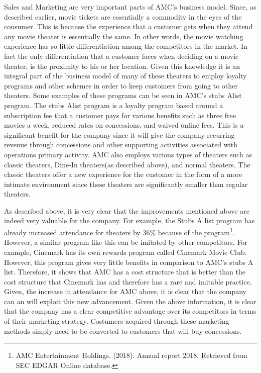 \documentclass[12pt]{article}
\begin{document}
Sales and Marketing are very important parts of AMC's business model. Since, as described earlier, movie tickets are essentially a commodity in the eyes of the consumer. This is because the experience that a customer gets when they attend any movie theater is essentially the same. In other words, the movie watching experience has so little differentiation among the competitors in the market. In fact the only differentiation that a customer faces when deciding on a movie theater, is the proximity to his or her location. Given this knowledge it is an integral part of the business model of many of these theaters to employ loyalty programs and other schemes in order to keep customers from going to other theaters. Some examples of these programs can be seen in AMC's stubs Alist program. The stubs Alist program is a loyalty program based around a subscription fee that a customer pays for various benefits such as three free movies a week, reduced rates on concessions, and waived online fees. This is a significant benefit for the company since it will give the company recurring revenue through concessions and other supporting activities associated with operations primary activity. AMC also employs various types of theaters such as classic theaters, Dine-In theaters(as described above), and normal theaters. The classic theaters offer a new experience for the customer in the form of a more intimate environment since these theaters are significantly smaller than regular theaters. 

As described above, it is very clear that the improvements mentioned above are indeed very valuable for the company. For example, the Stubs A list program has already increased attendance for theaters by 36\% because of the program\footnote{AMC Entertainment Holdings. (2018). Annual report 2018. Retrieved from SEC EDGAR Online database.}. However, a similar program like this can be imitated by other competitors. For example, Cinemark has its own rewards program called Cinemark Movie Club. However, this program gives very little benefits in comparison to AMC's stubs A list. Therefore, it shows that AMC has a cost structure that is better than the cost structure that Cinemark has and therefore has a rare and imitable practice. Given, the increase in attendance for AMC above, it is clear that the company can an will exploit this new advancement. Given the above information, it is clear that the company has a clear competitive advantage over its competitors in terms of their marketing strategy. Costumers acquired through these marketing methods simply need to be converted to customers that will buy concessions.
\end{document}
